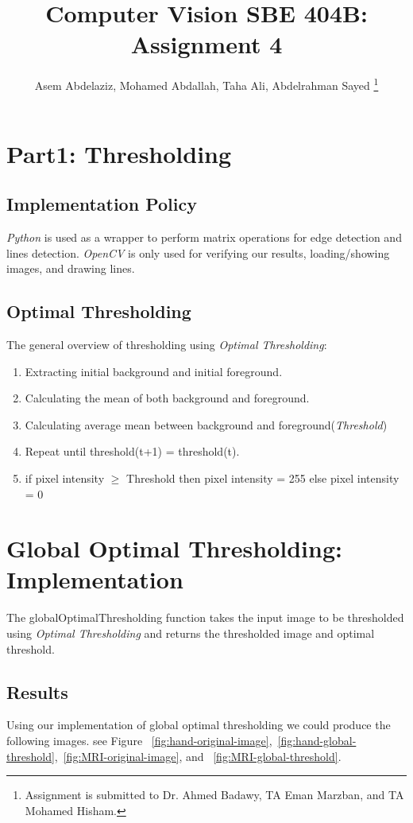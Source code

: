 \documentclass[letterpaper, 12 pt, conference ,onecolumn]{ieeeconf}  %
\title{
Computer Vision SBE 404B: Assignment 4
}
\author{
 Asem Abdelaziz,
 Mohamed Abdallah, 
 Taha Ali,
 Abdelrahman Sayed  
 \thanks{Assignment is submitted to Dr. Ahmed Badawy, TA Eman Marzban, and TA Mohamed Hisham.}
}
\begin{document}
\maketitle


\section*{Part1: Thresholding}
\subsection*{Implementation Policy}\label{implementation-policy}

\textit{Python} is used as a wrapper to perform matrix operations for edge detection and lines detection. \textit{OpenCV} is only used for verifying our results, loading/showing images, and drawing lines.
 
\subsection*{Optimal Thresholding} 
The general overview of thresholding  using \textit{Optimal Thresholding}:
\begin{enumerate}
\item Extracting initial background and initial foreground.
\item Calculating the mean of both background and foreground.
\item Calculating average mean between background and foreground(\textit{Threshold})
\item Repeat until threshold(t+1) = threshold(t).
\item if pixel intensity $\geq$ Threshold then pixel intensity = 255 else pixel intensity = 0
\end{enumerate} 

\section*{Global Optimal Thresholding: Implementation}
The globalOptimalThresholding function takes the input image to be thresholded using \textit{Optimal Thresholding} and returns the thresholded image and optimal threshold.


\subsection*{\textbf{Results}}
Using our implementation of global optimal thresholding we could produce the following images. see Figure ~\ref{fig:hand-original-image},~\ref{fig:hand-global-threshold},~\ref{fig:MRI-original-image}, and ~\ref{fig:MRI-global-threshold}.
\end{document}
